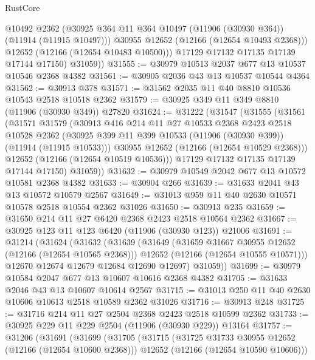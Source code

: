 \begin{lexlean}{RustCore}
\begin{coremodule}
              @10492
              @2362
              (@30925 @364 @11 @364 @10497 (@11906 (@30930 @364)) (@11914 (@11915 @10497)))
              @30955
              @12652
              (@12166 (@12654 @10493 @2368)))
            @12652
            (@12166 (@12654 @10483 @10500)))
          @17129
          @17132
          @17135
          @17139
          @17144
          @17150)
        @31059))
@31555 := @30979 @10513 @2037 @677 @13 @10537 @10546 @2368 @4382
@31561 := @30905 @2036 @43 @13 @10537 @10544 @4364
@31562 := @30913 @378
@31571 := @31562 @2035 @11 @40 @8810 @10536 @10543 @2518 @10518 @2362
@31579 := @30925 @349 @11 @349 @8810 (@11906 (@30930 @349)) @27820
@31624 := @31222
    (@31547
      (@31555
        (@31561
          (@31571
            @31579
            (@30913
              @416
              @214
              @11
              @27
              @10533
              @2368
              @2423
              @2518
              @10528
              @2362
              (@30925 @399 @11 @399 @10533 (@11906 (@30930 @399)) (@11914 (@11915 @10533)))
              @30955
              @12652
              (@12166 (@12654 @10529 @2368)))
            @12652
            (@12166 (@12654 @10519 @10536)))
          @17129
          @17132
          @17135
          @17139
          @17144
          @17150)
        @31059))
@31632 := @30979 @10549 @2042 @677 @13 @10572 @10581 @2368 @4382
@31633 := @30904 @266
@31639 := @31633 @2041 @43 @13 @10572 @10579 @2567
@31649 := @31013 @959 @11 @40 @2630 @10571 @10578 @2518 @10554 @2362 @31026
@31650 := @30913 @235
@31659 := @31650 @214 @11 @27 @6420 @2368 @2423 @2518 @10564 @2362
@31667 := @30925 @123 @11 @123 @6420 (@11906 (@30930 @123)) @21006
@31691 := @31214
    (@31624
      (@31632
        (@31639
          (@31649
            (@31659 @31667 @30955 @12652 (@12166 (@12654 @10565 @2368)))
            @12652
            (@12166 (@12654 @10555 @10571)))
          @12670
          @12674
          @12679
          @12684
          @12690
          @12697)
        @31059))
@31699 := @30979 @10584 @2047 @677 @13 @10607 @10616 @2368 @4382
@31705 := @31633 @2046 @43 @13 @10607 @10614 @2567
@31715 := @31013 @250 @11 @40 @2630 @10606 @10613 @2518 @10589 @2362 @31026
@31716 := @30913 @248
@31725 := @31716 @214 @11 @27 @2504 @2368 @2423 @2518 @10599 @2362
@31733 := @30925 @229 @11 @229 @2504 (@11906 (@30930 @229)) @13164
@31757 := @31206
    (@31691
      (@31699
        (@31705
          (@31715
            (@31725 @31733 @30955 @12652 (@12166 (@12654 @10600 @2368)))
            @12652
            (@12166 (@12654 @10590 @10606)))

\end{coremodule}
\end{lexlean}
